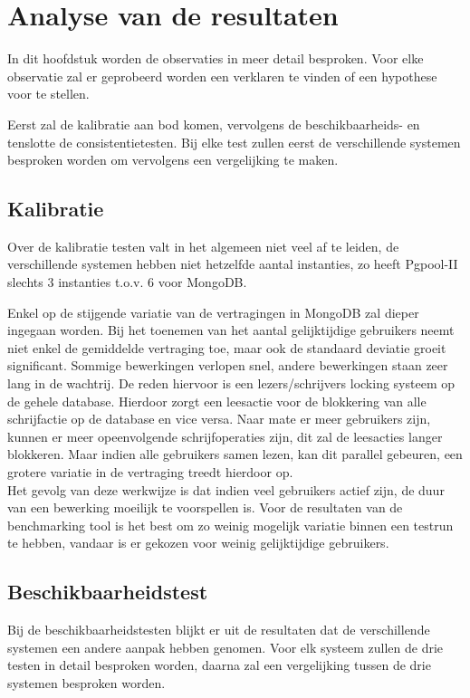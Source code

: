 \chapter{Analyse van de resultaten}\label{sec:analyse}
In dit hoofdstuk worden de observaties in meer detail besproken. Voor elke observatie zal er geprobeerd worden een verklaren te vinden of een hypothese voor te stellen. 

Eerst zal de kalibratie aan bod komen, vervolgens de beschikbaarheids- en tenslotte de consistentietesten. Bij elke test zullen eerst de verschillende systemen besproken worden om vervolgens een vergelijking te maken. 

\section{Kalibratie}
Over de kalibratie testen valt in het algemeen niet veel af te leiden, de verschillende systemen hebben niet hetzelfde aantal instanties, zo heeft Pgpool-II slechts 3 instanties t.o.v. 6 voor MongoDB. 

Enkel op de stijgende variatie van de vertragingen in MongoDB zal dieper ingegaan worden. Bij het toenemen van het aantal gelijktijdige gebruikers neemt niet enkel de gemiddelde vertraging toe, maar ook de standaard deviatie groeit significant. Sommige bewerkingen verlopen snel, andere bewerkingen staan zeer lang in de wachtrij. De reden hiervoor is een lezers/schrijvers locking systeem op de gehele database\cite{mongodb-concurrency}. Hierdoor zorgt een leesactie voor de blokkering van alle schrijfactie op de database en vice versa. Naar mate er meer gebruikers zijn, kunnen er meer opeenvolgende schrijfoperaties zijn, dit zal de leesacties langer blokkeren. Maar indien alle gebruikers samen lezen, kan dit parallel gebeuren, een grotere variatie in de vertraging treedt hierdoor op. \\
Het gevolg van deze werkwijze is dat indien veel gebruikers actief zijn, de duur van een bewerking moeilijk te voorspellen is. Voor de resultaten van de benchmarking tool is het best om zo weinig mogelijk variatie binnen een testrun te hebben, vandaar is er gekozen voor weinig gelijktijdige gebruikers.

\section{Beschikbaarheidstest}
Bij de beschikbaarheidstesten blijkt er uit de resultaten dat de verschillende systemen een andere aanpak hebben genomen. Voor elk systeem zullen de drie testen in detail besproken worden, daarna zal een vergelijking tussen de drie systemen besproken worden. 

